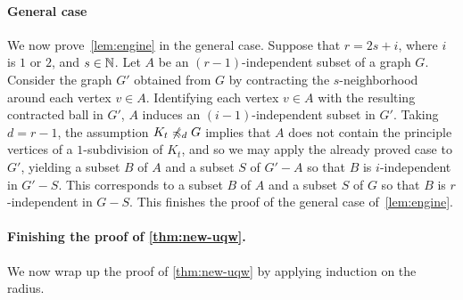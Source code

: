 \paragraph{General case}
We now prove~\cref{lem:engine} in the general case.
Suppose that $r=2s+i$, where $i$ is $1$ or $2$, and $s\in\mathbb{N}$. Let $A$ be an $(r-1)$-independent subset of a graph $G$. Consider the graph $G'$ obtained from $G$
by contracting the $s$-neighborhood around each vertex $v\in A$. Identifying each vertex $v\in A$ with the resulting contracted ball in $G'$,  $A$ induces an $(i-1)$-independent subset in $G'$. 
Taking $d=r-1$, the assumption $K_t\not\preccurlyeq_d G$
implies that $A$ does not contain the principle vertices of a $1$-subdivision of $K_t$, and so we may apply the already proved case to $G'$, yielding a subset $B$ of $A$ and a subset $S$ of $G'-A$
so that $B$ is $i$-independent in $G'-S$. 
This corresponds to a subset $B$ of $A$ and a subset $S$ of $G$
so that $B$ is $r$-independent in $G-S$.
This finishes  the proof of the general case of~\cref{lem:engine}.



\paragraph*{Finishing the proof of \cref{thm:new-uqw}.}
We now wrap up the proof of \cref{thm:new-uqw} by applying induction on the radius. 

